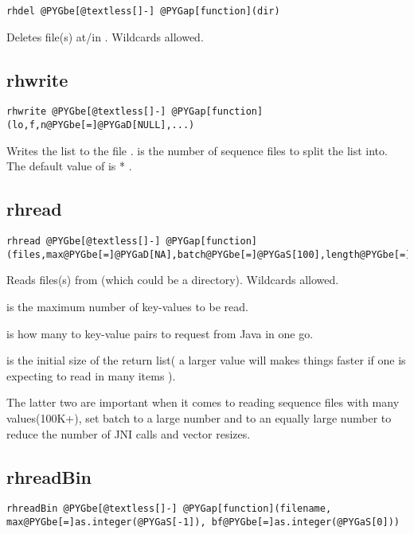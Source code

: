 \documentclass[letterpaper,10pt,english]{manual}
\begin{document}
\begin{Verbatim}[commandchars=@\[\]]
rhdel @PYGbe[@textless[]-] @PYGap[function](dir)
\end{Verbatim}

Deletes file(s) at/in . Wildcards allowed.


\subsection{rhwrite}

\begin{Verbatim}[commandchars=@\[\]]
rhwrite @PYGbe[@textless[]-] @PYGap[function](lo,f,n@PYGbe[=]@PYGaD[NULL],...)
\end{Verbatim}

Writes the list   to the file .  is the number of sequence files
to split the list into.  The default value of  is
 *  .


\subsection{rhread}

\begin{Verbatim}[commandchars=@\[\]]
rhread @PYGbe[@textless[]-] @PYGap[function](files,max@PYGbe[=]@PYGaD[NA],batch@PYGbe[=]@PYGaS[100],length@PYGbe[=]@PYGaS[1000])
\end{Verbatim}

Reads files(s) from  (which could be a directory). Wildcards allowed.

 is the maximum number of key-values to be read.

 is how many to key-value pairs to request from Java in one go.

 is the initial size of the return list( a larger value will makes
things faster if one is expecting to read in many items ).

The latter two are important when it comes to reading sequence files with many values(100K+), set
batch to a large number and  to an equally large number to reduce the
number of JNI calls and vector resizes.


\subsection{rhreadBin}

\begin{Verbatim}[commandchars=@\[\]]
rhreadBin @PYGbe[@textless[]-] @PYGap[function](filename, max@PYGbe[=]as.integer(@PYGaS[-1]), bf@PYGbe[=]as.integer(@PYGaS[0]))
\end{Verbatim}
\end{document}

